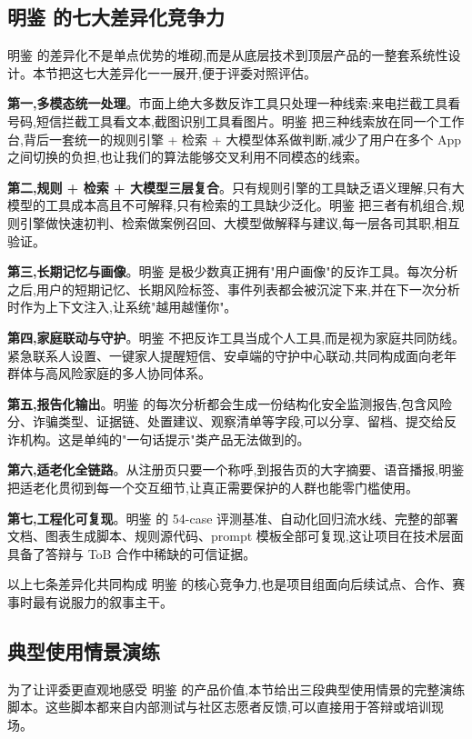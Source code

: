 \documentclass[UTF8,a4paper,12pt]{ctexart}
\begin{document}
\subsection{明鉴 的七大差异化竞争力}

明鉴 的差异化不是单点优势的堆砌,而是从底层技术到顶层产品的一整套系统性设计。本节把这七大差异化一一展开,便于评委对照评估。

\textbf{第一,多模态统一处理}。市面上绝大多数反诈工具只处理一种线索:来电拦截工具看号码,短信拦截工具看文本,截图识别工具看图片。明鉴 把三种线索放在同一个工作台,背后一套统一的规则引擎 + 检索 + 大模型体系做判断,减少了用户在多个 App 之间切换的负担,也让我们的算法能够交叉利用不同模态的线索。

\textbf{第二,规则 + 检索 + 大模型三层复合}。只有规则引擎的工具缺乏语义理解,只有大模型的工具成本高且不可解释,只有检索的工具缺少泛化。明鉴 把三者有机组合,规则引擎做快速初判、检索做案例召回、大模型做解释与建议,每一层各司其职,相互验证。

\textbf{第三,长期记忆与画像}。明鉴 是极少数真正拥有"用户画像"的反诈工具。每次分析之后,用户的短期记忆、长期风险标签、事件列表都会被沉淀下来,并在下一次分析时作为上下文注入,让系统"越用越懂你"。

\textbf{第四,家庭联动与守护}。明鉴 不把反诈工具当成个人工具,而是视为家庭共同防线。紧急联系人设置、一键家人提醒短信、安卓端的守护中心联动,共同构成面向老年群体与高风险家庭的多人协同体系。

\textbf{第五,报告化输出}。明鉴 的每次分析都会生成一份结构化安全监测报告,包含风险分、诈骗类型、证据链、处置建议、观察清单等字段,可以分享、留档、提交给反诈机构。这是单纯的"一句话提示"类产品无法做到的。

\textbf{第六,适老化全链路}。从注册页只要一个称呼,到报告页的大字摘要、语音播报,明鉴 把适老化贯彻到每一个交互细节,让真正需要保护的人群也能零门槛使用。

\textbf{第七,工程化可复现}。明鉴 的 54-case 评测基准、自动化回归流水线、完整的部署文档、图表生成脚本、规则源代码、prompt 模板全部可复现,这让项目在技术层面具备了答辩与 ToB 合作中稀缺的可信证据。

以上七条差异化共同构成 明鉴 的核心竞争力,也是项目组面向后续试点、合作、赛事时最有说服力的叙事主干。

\subsection{典型使用情景演练}

为了让评委更直观地感受 明鉴 的产品价值,本节给出三段典型使用情景的完整演练脚本。这些脚本都来自内部测试与社区志愿者反馈,可以直接用于答辩或培训现场。
\end{document}
